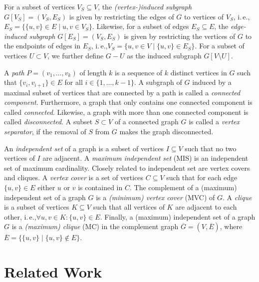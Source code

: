 \documentclass[a4paper,UKenglish,cleveref, autoref, thm-restate]{lipics-v2021}
\newcommand{\ie}{i.\,e.,\xspace}
\begin{document}
For a subset of vertices $V_S \subseteq V$, the \emph{(vertex-)induced subgraph}
$G[V_S] = (V_S, E_S)$ is given by restricting the edges of $G$ to vertices of $V_S$, \ie $E_S = \{\{u,v\} \in E \mid u,v \in V_S\}$.
Likewise, for a subset of edges $E_S \subseteq E$, the \emph{edge-induced
  subgraph} $G[E_S] = (V_S, E_S)$ is given by restricting the vertices of $G$ to the endpoints of edges in $E_S$, \ie $V_S = \{u,v \in V \mid \{u,v\} \in E_S\}$.
  For a subset of vertices $U \subset V$, we further define $G - U$ as the induced subgraph $G[V \setminus U]$.

A \emph{path} $P=(v_1, \ldots, v_k)$ of length $k$ is a sequence of $k$ distinct vertices in $G$ such that $\{v_i, v_{i+1}\} \in E$ for all $i \in \{1, \ldots, k-1\}$.
A subgraph of $G$ induced by a maximal subset of vertices that are connected by a path is called a \emph{connected component}.
Furthermore, a graph that only contains one connected component is called \emph{connected}.
Likewise, a graph with more than one connected component is called \emph{disconnected}.
A subset $S \subset V$ of a connected graph $G$ is called a \emph{vertex separator}, if the removal of $S$ from $G$ makes the graph disconnected.

An \emph{independent set} of a graph is a subset of vertices $I \subseteq V$ such that no two vertices of $I$ are adjacent. 
A \emph{maximum independent set} (MIS) is an independent set of maximum cardinality.
Closely related to independent set are vertex covers and cliques.
A \emph{vertex cover} is a set of vertices $C \subseteq V$ such that for each edge $\{u,v\} \in E$ either $u$ or $v$ is contained in $C$.
The complement of a (maximum) independent set of a graph $G$ is a \emph{(minimum) vertex cover} (MVC) of $G$.
A \emph{clique} is a subset of vertices $K \subseteq V$ such that all vertices of $K$ are adjacent to each other, \ie $\forall u,v \in K: \{u,v\} \in E$.
Finally, a (maximum) independent set of a graph $G$ is a \emph{(maximum) clique} (MC) in the complement graph $\overline{G} = (V, \overline{E})$, where $\overline{E} = \{\{u,v\} \mid \{u,v\} \not\in E\}$.

\section{Related Work}
\end{document}
